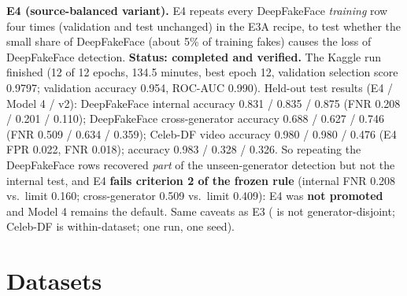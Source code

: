\documentclass[11pt,a4paper]{report}
\newcommand{\code}[1]{\texttt{\detokenize{#1}}}
\begin{document}
\textbf{E4 (source-balanced variant).} E4 repeats every DeepFakeFace \emph{training} row four times (validation and test unchanged) in the E3A recipe, to test whether the small share of DeepFakeFace (about 5\% of training fakes) causes the loss of DeepFakeFace detection.
\textbf{Status: completed and verified.} The Kaggle run finished (12 of 12 epochs, 134.5 minutes, best epoch 12, validation selection score 0.9797; validation accuracy 0.954, ROC-AUC 0.990). Held-out test results (E4 / Model 4 / v2): DeepFakeFace internal accuracy 0.831 / 0.835 / 0.875 (FNR 0.208 / 0.201 / 0.110); DeepFakeFace cross-generator accuracy 0.688 / 0.627 / 0.746 (FNR 0.509 / 0.634 / 0.359); Celeb-DF video accuracy 0.980 / 0.980 / 0.476 (E4 FPR 0.022, FNR 0.018); \code{modern_test} accuracy 0.983 / 0.328 / 0.326. So repeating the DeepFakeFace rows recovered \emph{part} of the unseen-generator detection but not the internal test, and E4 \textbf{fails criterion 2 of the frozen rule} (internal FNR 0.208 vs.\ limit 0.160; cross-generator 0.509 vs.\ limit 0.409): E4 was \textbf{not promoted} and Model 4 remains the default. Same caveats as E3 (\code{modern_test} is not generator-disjoint; Celeb-DF is within-dataset; one run, one seed).

\chapter{Datasets}
\end{document}
